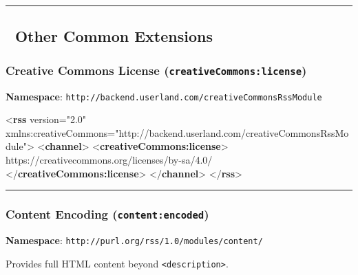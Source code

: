 \documentclass[
  letterpaper,
  DIV=11,
  numbers=noendperiod]{scrartcl}
\newenvironment{Shaded}{\begin{snugshade}}{\end{snugshade}}
\newcommand{\KeywordTok}[1]{\textcolor[rgb]{0.00,0.23,0.31}{\textbf{#1}}}
\newcommand{\NormalTok}[1]{\textcolor[rgb]{0.00,0.23,0.31}{#1}}
\newcommand{\OtherTok}[1]{\textcolor[rgb]{0.00,0.23,0.31}{#1}}
\newcommand{\StringTok}[1]{\textcolor[rgb]{0.13,0.47,0.30}{#1}}
\begin{document}
\begin{center}\rule{0.5\linewidth}{0.5pt}\end{center}

\subsection{🔌 Other Common Extensions}\label{other-common-extensions}

\subsubsection{\texorpdfstring{Creative Commons License
(\texttt{creativeCommons:license})}{Creative Commons License (creativeCommons:license)}}\label{creative-commons-license-creativecommonslicense}

\textbf{Namespace}:
\texttt{http://backend.userland.com/creativeCommonsRssModule}

\begin{Shaded}
\begin{Highlighting}[]
\NormalTok{\textless{}}\KeywordTok{rss}\OtherTok{ version=}\StringTok{"2.0"} 
\OtherTok{     xmlns:creativeCommons=}\StringTok{"http://backend.userland.com/creativeCommonsRssModule"}\NormalTok{\textgreater{}}
\NormalTok{  \textless{}}\KeywordTok{channel}\NormalTok{\textgreater{}}
\NormalTok{    \textless{}}\KeywordTok{creativeCommons:license}\NormalTok{\textgreater{}}
\NormalTok{      https://creativecommons.org/licenses/by{-}sa/4.0/}
\NormalTok{    \textless{}/}\KeywordTok{creativeCommons:license}\NormalTok{\textgreater{}}
\NormalTok{  \textless{}/}\KeywordTok{channel}\NormalTok{\textgreater{}}
\NormalTok{\textless{}/}\KeywordTok{rss}\NormalTok{\textgreater{}}
\end{Highlighting}
\end{Shaded}

\begin{center}\rule{0.5\linewidth}{0.5pt}\end{center}

\subsubsection{\texorpdfstring{Content Encoding
(\texttt{content:encoded})}{Content Encoding (content:encoded)}}\label{content-encoding-contentencoded}

\textbf{Namespace}: \texttt{http://purl.org/rss/1.0/modules/content/}

Provides full HTML content beyond
\texttt{\textless{}description\textgreater{}}.
\end{document}

